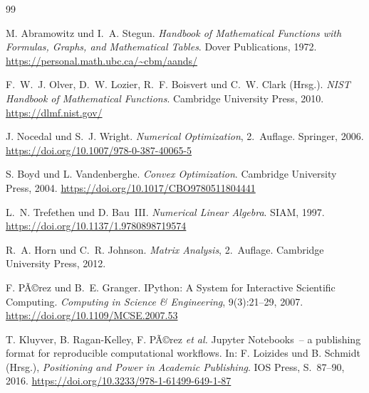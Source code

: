\documentclass[12pt, a4paper]{article}
\begin{document}
\begin{thebibliography}{99}

M. Abramowitz und I.~A. Stegun.
\textit{Handbook of Mathematical Functions with Formulas, Graphs,
and Mathematical Tables}.
Dover Publications, 1972.
\url{https://personal.math.ubc.ca/~cbm/aands/}

F.~W.~J. Olver, D.~W. Lozier, R.~F. Boisvert und C.~W. Clark (Hrsg.).
\textit{{NIST} Handbook of Mathematical Functions}.
Cambridge University Press, 2010.
\url{https://dlmf.nist.gov/}


J. Nocedal und S.~J. Wright.
\textit{Numerical Optimization}, 2.~Auflage.
Springer, 2006.
\url{https://doi.org/10.1007/978-0-387-40065-5}

S. Boyd und L. Vandenberghe.
\textit{Convex Optimization}.
Cambridge University Press, 2004.
\url{https://doi.org/10.1017/CBO9780511804441}


L.~N. Trefethen und D. Bau~III.
\textit{Numerical Linear Algebra}.
SIAM, 1997.
\url{https://doi.org/10.1137/1.9780898719574}

R.~A. Horn und C.~R. Johnson.
\textit{Matrix Analysis}, 2.~Auflage.
Cambridge University Press, 2012.


F. PÃ©rez und B.~E. Granger.
{IPython}: A System for Interactive Scientific Computing.
\textit{Computing in Science \& Engineering}, 9(3):21--29, 2007.
\url{https://doi.org/10.1109/MCSE.2007.53}

T. Kluyver, B. Ragan-Kelley, F. PÃ©rez \textit{et al.}
Jupyter Notebooks~-- a publishing format for reproducible computational
workflows.
In: F. Loizides und B. Schmidt (Hrsg.), \textit{Positioning and Power in
Academic Publishing}. IOS Press, S.~87--90, 2016.
\url{https://doi.org/10.3233/978-1-61499-649-1-87}


\end{thebibliography}
\end{document}
